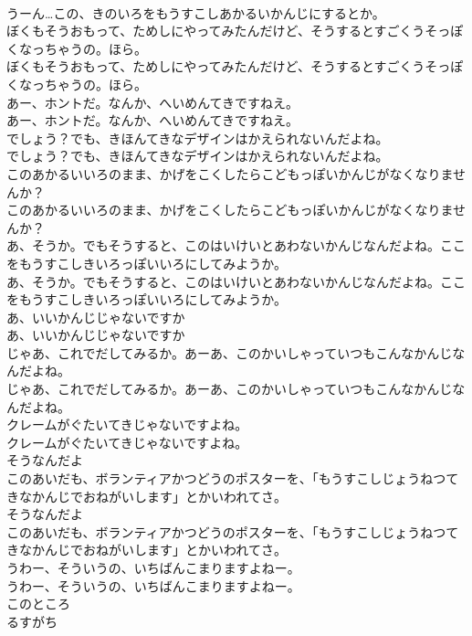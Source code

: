 \documentclass[8pt]{extreport}
\begin{document}
\begin{CJK}{UTF8}{min}
\\	うーん…この、きのいろをもうすこしあかるいかんじにするとか。
\\	ぼくもそうおもって、ためしにやってみたんだけど、そうするとすごくうそっぽくなっちゃうの。ほら。
\\	ぼくもそうおもって、ためしにやってみたんだけど、そうするとすごくうそっぽくなっちゃうの。ほら。
\\	あー、ホントだ。なんか、へいめんてきですねえ。
\\	あー、ホントだ。なんか、へいめんてきですねえ。
\\	でしょう？でも、きほんてきなデザインはかえられないんだよね。
\\	でしょう？でも、きほんてきなデザインはかえられないんだよね。
\\	このあかるいいろのまま、かげをこくしたらこどもっぽいかんじがなくなりませんか？
\\	このあかるいいろのまま、かげをこくしたらこどもっぽいかんじがなくなりませんか？
\\	あ、そうか。でもそうすると、このはいけいとあわないかんじなんだよね。ここをもうすこしきいろっぽいいろにしてみようか。
\\	あ、そうか。でもそうすると、このはいけいとあわないかんじなんだよね。ここをもうすこしきいろっぽいいろにしてみようか。
\\	あ、いいかんじじゃないですか
\\	あ、いいかんじじゃないですか
\\	じゃあ、これでだしてみるか。あーあ、このかいしゃっていつもこんなかんじなんだよね。
\\	じゃあ、これでだしてみるか。あーあ、このかいしゃっていつもこんなかんじなんだよね。
\\	クレームがぐたいてきじゃないですよね。
\\	クレームがぐたいてきじゃないですよね。
\\	そうなんだよ
\\	このあいだも、ボランティアかつどうのポスターを、「もうすこしじょうねつてきなかんじでおねがいします」とかいわれてさ。
\\	そうなんだよ
\\	このあいだも、ボランティアかつどうのポスターを、「もうすこしじょうねつてきなかんじでおねがいします」とかいわれてさ。
\\	うわー、そういうの、いちばんこまりますよねー。
\\	うわー、そういうの、いちばんこまりますよねー。
\\	このところ
\\	るすがち

\end{CJK}
\end{document}
